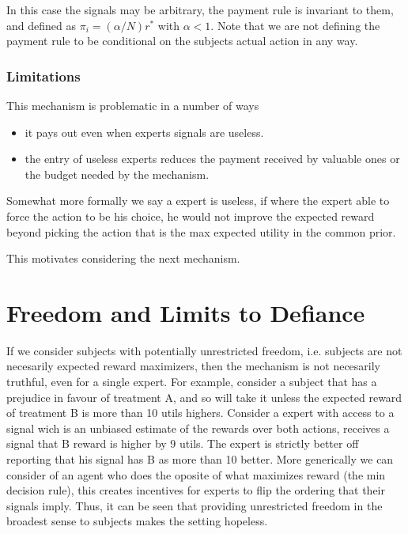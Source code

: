 In this case the signals may be arbitrary, the payment rule is invariant to them, and defined as $\pi_i  = (\alpha / N ) r^{*} $ with $\alpha < 1$. Note that we are not defining the payment rule to be conditional on the subjects actual action in any way. %


\subsubsection{Limitations}
This mechanism is problematic in a number of ways

\begin{itemize}
\item it pays out even when experts signals are useless.
\item the entry of useless experts reduces the payment received by valuable ones or the budget needed by the mechanism.
\end{itemize}

Somewhat more formally we say a expert is useless, if where the expert able to force the action to be his choice, he would not improve the expected reward beyond picking the action that is the max expected utility in the common prior.

This motivates considering the next mechanism.


\section{Freedom and Limits to Defiance}

If we consider subjects with potentially unrestricted freedom, i.e. subjects are not necesarily expected reward maximizers, then the mechanism is not necesarily truthful, even for a single expert. For example, consider a subject that has a prejudice in favour of treatment A, and so will take it unless the expected reward of treatment B is more than 10 utils highers. Consider a expert with access to a signal wich is an unbiased estimate of the rewards over both actions, receives a signal  that B reward is higher by 9 utils. The expert is strictly better off reporting that his signal has B as more than 10 better.
More generically we can consider of an agent who does the oposite of what maximizes reward (the min decision rule), this creates incentives for experts to flip the ordering that their signals imply. Thus, it can be seen that providing unrestricted freedom in the broadest sense to subjects makes the setting hopeless. 

